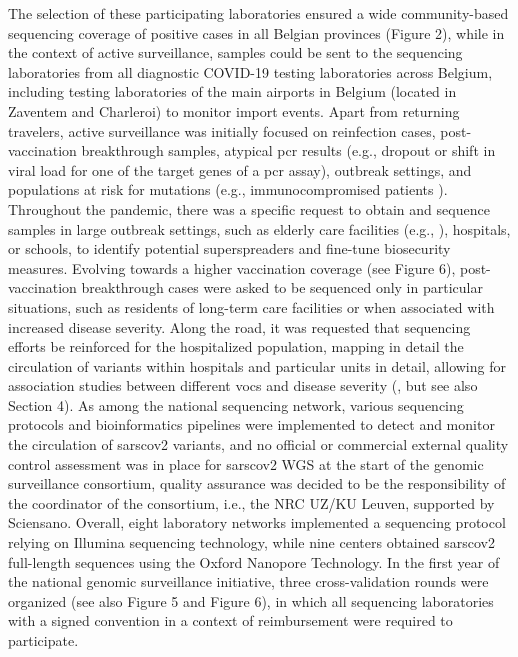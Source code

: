 The selection of these participating laboratories ensured a wide community-based sequencing coverage of positive cases in all Belgian provinces (Figure 2), while in the context of active surveillance, samples could be sent to the sequencing laboratories from all diagnostic COVID-19 testing laboratories across Belgium, including testing laboratories of the main airports in Belgium (located in Zaventem and Charleroi) to monitor import events.
Apart from returning travelers, active surveillance was initially focused on reinfection cases, post-vaccination breakthrough samples, atypical \gls{pcr} results (e.g., dropout or shift in viral load for one of the target genes of a \gls{pcr} assay), outbreak settings, and populations at risk for mutations (e.g., immunocompromised patients \citep{vandermoeren2022viral}).
Throughout the pandemic, there was a specific request to obtain and sequence samples in large outbreak settings, such as elderly care facilities (e.g., \citep{vuylsteke2022role}), hospitals, or schools, to identify potential superspreaders and fine-tune biosecurity measures.
Evolving towards a higher vaccination coverage (see Figure 6), post-vaccination breakthrough cases were asked to be sequenced only in particular situations, such as residents of long-term care facilities or when associated with increased disease severity.
Along the road, it was requested that sequencing efforts be reinforced for the hospitalized population, mapping in detail the circulation of variants within hospitals and particular units in detail, allowing for association studies between different \gls{voc}s and disease severity (\citep{vangoethem2022severity,vangoethem2022clinical}, but see also Section 4).
As among the national sequencing network, various sequencing protocols and bioinformatics pipelines were implemented to detect and monitor the circulation of \gls{sarscov2} variants, and no official or commercial external quality control assessment was in place for \gls{sarscov2} WGS at the start of the genomic surveillance consortium, quality assurance was decided to be the responsibility of the coordinator of the consortium, i.e., the NRC UZ/KU Leuven, supported by Sciensano.
Overall, eight laboratory networks implemented a sequencing protocol relying on Illumina sequencing technology, while nine centers obtained \gls{sarscov2} full-length sequences using the Oxford Nanopore Technology.
In the first year of the national genomic surveillance initiative, three cross-validation rounds were organized (see also Figure 5 and Figure 6), in which all sequencing laboratories with a signed convention in a context of reimbursement were required to participate.
